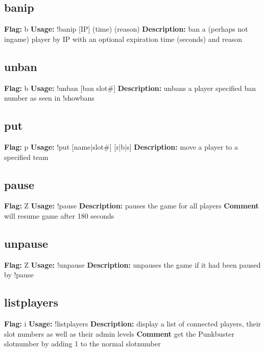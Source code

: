 \subsection{banip}
\textbf{Flag:} \hfill b \linebreak\textbf{Usage:} \hfill !banip [IP] (time) (reason) \linebreak
\textbf{Description:} \hfill ban a (perhaps not ingame) player by IP with an optional expiration time (seconds) and reason

\subsection{unban}
\textbf{Flag:} \hfill b \linebreak\textbf{Usage:} \hfill !unban [ban slot\#] \linebreak
\textbf{Description:} \hfill unbans a player specified ban number as seen in !showbans

\subsection{put}
\textbf{Flag:} \hfill p \linebreak\textbf{Usage:} \hfill !put [name|slot\#] [r|b|s] \linebreak
\textbf{Description:} \hfill move a player to a specified team

\subsection{pause}
\textbf{Flag:} \hfill Z \linebreak\textbf{Usage:} \hfill !pause  \linebreak
\textbf{Description:} \hfill pauses the game for all players
\linebreak
\textbf{Comment} \hfill will resume game after 180 seconds

\subsection{unpause}
\textbf{Flag:} \hfill Z \linebreak\textbf{Usage:} \hfill !unpause  \linebreak
\textbf{Description:} \hfill unpauses the game if it had been paused by !pause

\subsection{listplayers}
\textbf{Flag:} \hfill i \linebreak\textbf{Usage:} \hfill !listplayers  \linebreak
\textbf{Description:} \hfill display a list of connected players, their slot numbers as well as their admin levels
\linebreak
\textbf{Comment} \hfill get the Punkbuster slotnumber by adding 1 to the normal slotnumber

